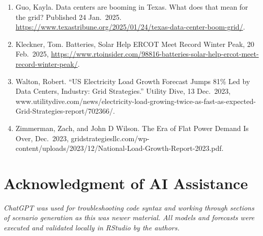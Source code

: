 \documentclass[
]{article}
\begin{document}
\begin{enumerate}
\def\labelenumi{\arabic{enumi}.}
\item
  Guo, Kayla. Data centers are booming in Texas. What does that mean for
  the grid? Published 24 Jan.~2025.
  \url{https://www.texastribune.org/2025/01/24/texas-data-center-boom-grid/}.
\item
  Kleckner, Tom. Batteries, Solar Help ERCOT Meet Record Winter Peak, 20
  Feb.~2025,
  \url{https://www.rtoinsider.com/98816-batteries-solar-help-ercot-meet-record-winter-peak/}.
\item
  Walton, Robert. ``US Electricity Load Growth Forecast Jumps 81\% Led
  by Data Centers, Industry: Grid Strategies.'' Utility Dive, 13
  Dec.~2023,
  www.utilitydive.com/news/electricity-load-growing-twice-as-fast-as-expected-Grid-Strategies-report/702366/.
\item
  Zimmerman, Zach, and John D Wilson. The Era of Flat Power Demand Is
  Over, Dec.~2023,
  gridstrategiesllc.com/wp-content/uploads/2023/12/National-Load-Growth-Report-2023.pdf.
\end{enumerate}

\section{Acknowledgment of AI
Assistance}\label{acknowledgment-of-ai-assistance}

\emph{ChatGPT was used for troubleshooting code syntax and working
through sections of scenario generation as this was newer material. All
models and forecasts were executed and validated locally in RStudio by
the authors.}
\end{document}
